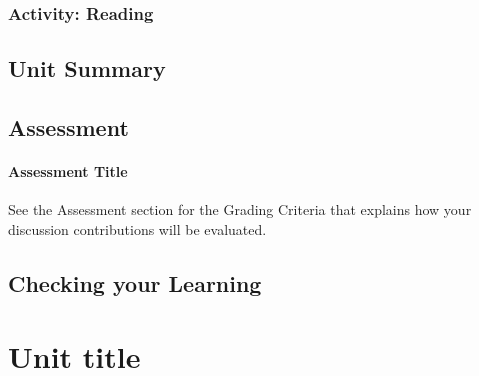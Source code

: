 \documentclass[
]{book}
\begin{document}
\hypertarget{activity-reading-5}{%
\subsection*{Activity: Reading}\label{activity-reading-5}}

\begin{reflect}

\end{reflect}

\hypertarget{unit-summary-5}{%
\section*{Unit Summary}\label{unit-summary-5}}

\hypertarget{assessment-6}{%
\section*{Assessment}\label{assessment-6}}

\begin{assessment}
\hypertarget{assessment-title}{%
\subsubsection*{Assessment Title}\label{assessment-title}}

See the Assessment section for the Grading Criteria that explains how
your discussion contributions will be evaluated.
\end{assessment}

\hypertarget{checking-your-learning-6}{%
\section*{Checking your Learning}\label{checking-your-learning-6}}

\begin{progress}

\end{progress}

\hypertarget{unit-title-7}{%
\chapter{Unit title}\label{unit-title-7}}
\end{document}

